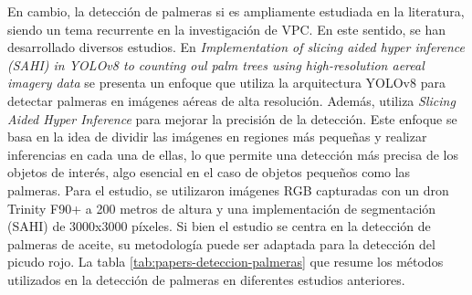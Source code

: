 
En cambio, la detección de palmeras si es ampliamente estudiada en la literatura, siendo un tema recurrente en la investigación de VPC. En este sentido, se han desarrollado diversos estudios. En \textit{Implementation of slicing aided hyper inference (SAHI) in YOLOv8 to counting oul palm trees using high-resolution aereal imagery data} \citep{zhorif_implementation_2024} se presenta un enfoque que utiliza la arquitectura YOLOv8 para detectar palmeras en imágenes aéreas de alta resolución. Además, utiliza \textit{Slicing Aided Hyper Inference} para mejorar la precisión de la detección. Este enfoque se basa en la idea de dividir las imágenes en regiones más pequeñas y realizar inferencias en cada una de ellas, lo que permite una detección más precisa de los objetos de interés, algo esencial en el caso de objetos pequeños como las palmeras. Para el estudio, se utilizaron imágenes RGB capturadas con un dron Trinity F90+ a 200 metros de altura y una implementación de segmentación (SAHI) de 3000x3000 píxeles. Si bien el estudio se centra en la detección de palmeras de aceite, su metodología puede ser adaptada para la detección del picudo rojo. La tabla \ref{tab:papers-deteccion-palmeras} que resume los métodos utilizados en la detección de palmeras en diferentes estudios anteriores.

